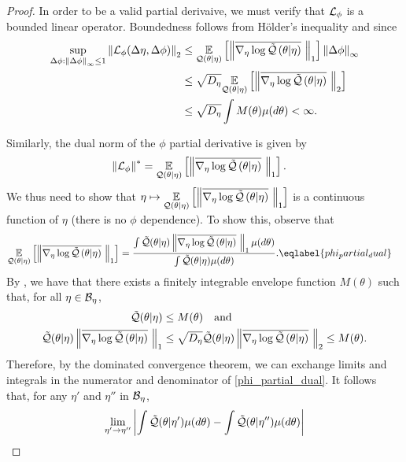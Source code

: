 \begin{lem}
\begin{proof}
In order to be a valid partial derivaive, we must verify that $\mathcal{L}_\phi$ is a
bounded linear operator.  Boundedness follows from H{\"o}lder's inequality and
 since
%
\begin{align*}
%
\sup_{\Delta\phi: \norminf{\Delta\phi} \le 1}
    \norm{\linop_\phi(\Delta \eta, \Delta \phi)}_2
\le{}&
\expect{\q(\theta \vert \eta)}
       {\norm{\lqgradbar{\theta \vert \eta}}_1} \norminf{\Delta \phi}
\\\le{}&
\sqrt{\etadim}\expect{\q(\theta \vert \eta)}
       {\norm{\lqgradbar{\theta \vert \eta}}_2}
\\\le{}&
\sqrt{\etadim} \int M(\theta) \mu(d\theta) < \infty.
%
\end{align*}

Similarly, the dual norm of the $\phi$ partial derivative is given by
%
\begin{align*}
%
\norm{\linop_\phi}^* ={}& \expect{\q(\theta \vert \eta)}
       {\norm{\lqgradbar{\theta \vert \eta}}_1}.
%
\end{align*}
%
We thus need to show that $\eta \mapsto \underset{\mathcal{Q}(\theta \vert \eta)}{\mathbb{E}}\left[\left\Vert\overline{{\nabla_\eta \log \tilde{\mathcal{Q}}}\left(\theta \vert \eta\right)}\,\,\right\Vert_1\right]$ is a continuous function of $\eta$
(there is no $\phi$ dependence).  To show this, observe that
%
\begin{align}
%
\expect{\q(\theta \vert \eta)}
       {\norm{\lqgradbar{\theta \vert \eta}}_1} ={}&
\frac{\int \qtil(\theta \vert \eta)
           \norm{\lqgradbar{\theta \vert \eta}}_1 \mu(d\theta)}
     {\int \qtil(\theta \vert \eta) \mu(d\theta)}.
    \eqlabel{phi_partial_dual}
%
\end{align}
%
By , we have that there exists a finitely integrable
envelope function $M(\theta)$ such that, for all $\eta \in \mathcal{B}_\eta$,
%
\begin{align*}
%
\qtil(\theta \vert \eta) \le{}& M(\theta) \mathand \\
\qtil(\theta \vert \eta)
           \norm{\lqgradbar{\theta \vert \eta}}_1
    \le{}&
\sqrt{\etadim} \qtil(\theta \vert \eta)
           \norm{\lqgradbar{\theta \vert \eta}}_2
           \le{} M(\theta).
%
\end{align*}
%
Therefore, by the dominated convergence theorem, we can exchange limits and
integrals in the numerator and denominator of \eqref{phi_partial_dual}.  It
follows that, for any $\eta'$ and $\eta''$ in $\mathcal{B}_\eta$,
%
\begin{align*}
%
\lim_{\eta' \rightarrow \eta''}
\abs{\int \qtil(\theta \vert \eta') \mu(d\theta) -
     \int \qtil(\theta \vert \eta'') \mu(d\theta)}

\end{align*}
\end{proof}
\end{lem}
